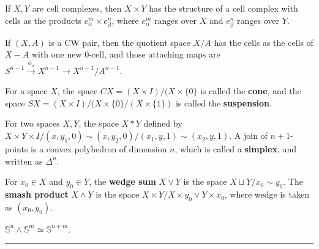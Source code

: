 \begin{defn} If $X,Y$ are cell complexes, then $X\times Y$ has the structure of a cell complex with cells as the products $e_\alpha^m\times e_\beta^n$, where $e_\alpha^m$ ranges over $X$ and $e_\beta^n$ ranges over $Y$.
\end{defn}

\begin{defn} If $(X,A)$ is a CW pair, then the quotient space $X/A$ has the cells as the cells of $X-A$ with one new 0-cell, and those attaching maps are $S^{n-1}\xrightarrow{\phi_\alpha}X^{n-1}\rightarrow X^{n-1}/A^{n-1}$.
\end{defn}

\begin{defn} For a space $X$, the space $CX=(X\times I)/(X\times \{0\}$ is called the \textbf{cone}, and the space $SX=(X\times I)/(X\times \{0\}/(X\times \{1\})$ is called the \textbf{suspension}.
\end{defn}

\begin{defn} For two spaces $X,Y$, the space $X*Y$ defined by $X\times Y\times I/(x,y_1,0)\sim (x,y_2,0)/(x_1,y,1)\sim (x_2,y,1)$. A join of $n+1$-points is a convex polyhedron of dimension $n$, which is called a \textbf{simplex}, and written as $\Delta^{n}$.
\end{defn}

\begin{defn} For $x_0\in X$ and $y_0\in Y$, the \textbf{wedge sum} $X\vee Y$ is the space $X\sqcup Y/x_0\sim y_0$. The \textbf{smash product} $X\wedge Y$ is the space $X\times Y/X\times {y_0}\vee Y\times {x_0}$, where wedge is taken as $(x_0,y_0)$.
\end{defn}
\begin{exmp} $\mathbb{S}^n\wedge \mathbb{S}^m\simeq \mathbb{S}^{n+m}$.
\end{exmp}

\noindent\rule{\textwidth}{1pt}
\newline
